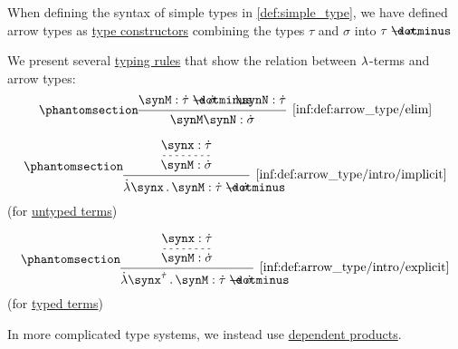 \begin{definition}\label{def:arrow_type}
  When defining the syntax of simple types in \cref{def:simple_type}, we have defined arrow types as \hyperref[con:type_constructor]{type constructors} combining the types \( \tau \) and \( \sigma \) into \( \tau \synimplies \sigma \).

  We present several \hyperref[def:type_derivation_tree]{typing rules} that show the relation between \( {\mathrm \lambda} \)-terms and arrow types:
  \begin{equation*}\taglabel[\ensuremath{ \rightarrow_- }]{inf:def:arrow_type/elim}
    \begin{prooftree}
      \hypo{ \synM: \syn\tau \synimplies \syn\sigma }
      \hypo{ \synN: \syn\tau }
      \infer2[\ref{inf:def:arrow_type/elim}]{ \synM \synN: \syn\sigma }
    \end{prooftree}
  \end{equation*}

  \begin{paracol}{2}
    \begin{leftcolumn}
      \centering
      \ParacolAlignmentHack
      \begin{equation*}\taglabel[\ensuremath{ \rightarrow_+^{\logic{ut}} }]{inf:def:arrow_type/intro/implicit}
        \begin{prooftree}
          \hypo{ \synx: \syn\tau }
          \infer[dashed]1{ \synM: \syn\sigma }
          \infer1[\ref{inf:def:arrow_type/intro/implicit}]{ \qabs \synx \synM: \syn\tau \synimplies \syn\sigma }
        \end{prooftree}
      \end{equation*}
      (for \hyperref[def:lambda_term]{untyped terms})
    \end{leftcolumn}

    \begin{rightcolumn}
      \centering
      \ParacolAlignmentHack
      \begin{equation*}\taglabel[\ensuremath{ \rightarrow_+^{\logic{tt}} }]{inf:def:arrow_type/intro/explicit}
        \begin{prooftree}
          \hypo{ \synx: \syn\tau }
          \infer[dashed]1{ \synM: \syn\sigma }
          \infer1[\ref{inf:def:arrow_type/intro/explicit}]{ \qabs {\synx^{\syn\tau}} \synM: \syn\tau \synimplies \syn\sigma }
        \end{prooftree}
      \end{equation*}
      (for \hyperref[def:typed_lambda_term]{typed terms})
    \end{rightcolumn}
  \end{paracol}
\end{definition}
\begin{comments}
  \item In more complicated type systems, we instead use \hyperref[def:dependent_product]{dependent products}.
\end{comments}

